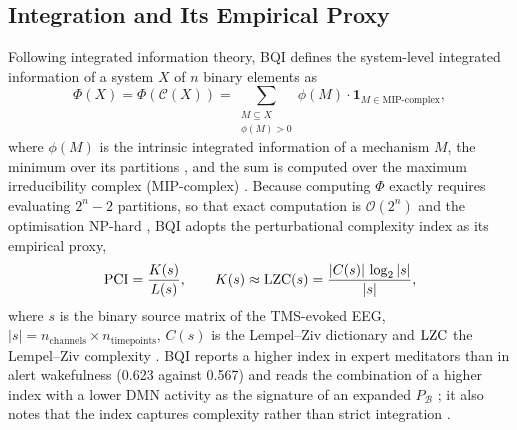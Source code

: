 \subsection{Integration and Its Empirical Proxy}
\label{sec:theory-phi}
Following integrated information theory, BQI defines the system-level integrated information of a system $X$ of $n$ binary elements as
\begin{equation}
  \Phi(X)=\Phi(\mathcal C(X))=\sum_{\substack{M\subseteq X\\ \phi(M)>0}}\phi(M)\cdot\mathbf 1_{M\in\text{MIP-complex}},
  \label{eq:bqi-phi}
\end{equation}
where $\phi(M)$ is the intrinsic integrated information of a mechanism $M$, the minimum over its partitions \cite[eq.~(47)]{BQI}, and the sum is computed over the maximum irreducibility complex (MIP-complex) \cite[Sec.~6.1, eq.~(48)]{BQI}. Because computing $\Phi$ exactly requires evaluating $2^n-2$ partitions, so that exact computation is $\mathcal O(2^n)$ and the optimisation NP-hard \cite[Proposition~6.1]{BQI}, BQI adopts the perturbational complexity index as its empirical proxy,
\begin{equation}
  \mathrm{PCI}=\frac{K(s)}{L(s)},\qquad K(s)\approx\mathrm{LZC}(s)=\frac{|C(s)|\,\log_2|s|}{|s|},
  \label{eq:bqi-pci}
\end{equation}
where $s$ is the binary source matrix of the TMS-evoked EEG, $|s|=n_{\mathrm{channels}}\times n_{\mathrm{timepoints}}$, $C(s)$ is the Lempel--Ziv dictionary and $\mathrm{LZC}$ the Lempel--Ziv complexity \cite[Sec.~6.3, eq.~(49)]{BQI}. BQI reports a higher index in expert meditators than in alert wakefulness (0.623 against 0.567) and reads the combination of a higher index with a lower DMN activity as the signature of an expanded $P_{\mathcal B}$ \cite[Table~4 and Remark~6.1]{BQI}; it also notes that the index captures complexity rather than strict integration \cite[Sec.~11.3]{BQI}.

